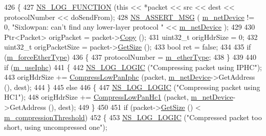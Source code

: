 \begin{DoxyCode}
426 \{
427   \hyperlink{log-macros-disabled_8h_a90b90d5bad1f39cb1b64923ea94c0761}{NS\_LOG\_FUNCTION} (\textcolor{keyword}{this} << *packet << src << dest << protocolNumber << doSendFrom);
428   \hyperlink{assert_8h_aff5ece9066c74e681e74999856f08539}{NS\_ASSERT\_MSG} ( \hyperlink{classns3_1_1SixLowPanNetDevice_a758b615a8b8f811ae3517ab9c7574f7b}{m\_netDevice} != 0, \textcolor{stringliteral}{"Sixlowpan: can't find any lower-layer protocol
       "} << \hyperlink{classns3_1_1SixLowPanNetDevice_a758b615a8b8f811ae3517ab9c7574f7b}{m\_netDevice} );
429 
430   Ptr<Packet> origPacket = packet->\hyperlink{classns3_1_1Packet_a5d5c70802a5f77fc5f0001e0cfc1898b}{Copy} ();
431   uint32\_t origHdrSize = 0;
432   uint32\_t origPacketSize = packet->\hyperlink{classns3_1_1Packet_a462855c9929954d4301a4edfe55f4f1c}{GetSize} ();
433   \textcolor{keywordtype}{bool} ret = \textcolor{keyword}{false};
434 
435   \textcolor{keywordflow}{if} (\hyperlink{classns3_1_1SixLowPanNetDevice_a57d9f56656023ad738e092ba9f668192}{m\_forceEtherType})
436     \{
437       protocolNumber = \hyperlink{classns3_1_1SixLowPanNetDevice_afdea8e77d8ec66aef94e8cdbb645004b}{m\_etherType};
438     \}
439 
440   \textcolor{keywordflow}{if} (\hyperlink{classns3_1_1SixLowPanNetDevice_a304a0244019df2ca598b655210d82533}{m\_useIphc})
441     \{
442       \hyperlink{group__logging_ga88acd260151caf2db9c0fc84997f45ce}{NS\_LOG\_LOGIC} (\textcolor{stringliteral}{"Compressing packet using IPHC"});
443       origHdrSize += \hyperlink{classns3_1_1SixLowPanNetDevice_a67bf1501ba018d90c5bdb442371a3722}{CompressLowPanIphc} (packet, \hyperlink{classns3_1_1SixLowPanNetDevice_a758b615a8b8f811ae3517ab9c7574f7b}{m\_netDevice}->GetAddress (), 
      dest);
444     \}
445   \textcolor{keywordflow}{else}
446     \{
447       \hyperlink{group__logging_ga88acd260151caf2db9c0fc84997f45ce}{NS\_LOG\_LOGIC} (\textcolor{stringliteral}{"Compressing packet using HC1"});
448       origHdrSize += \hyperlink{classns3_1_1SixLowPanNetDevice_a0e1957fbfb793cd011b4b3f89c550b8f}{CompressLowPanHc1} (packet, \hyperlink{classns3_1_1SixLowPanNetDevice_a758b615a8b8f811ae3517ab9c7574f7b}{m\_netDevice}->GetAddress (), 
      dest);
449     \}
450 
451   \textcolor{keywordflow}{if} (packet->\hyperlink{classns3_1_1Packet_a462855c9929954d4301a4edfe55f4f1c}{GetSize} () < \hyperlink{classns3_1_1SixLowPanNetDevice_a61c90503b8ea0015e2c3e4dc1f599582}{m\_compressionThreshold})
452     \{
453       \hyperlink{group__logging_ga88acd260151caf2db9c0fc84997f45ce}{NS\_LOG\_LOGIC} (\textcolor{stringliteral}{"Compressed packet too short, using uncompressed one"});

\end{DoxyCode}
